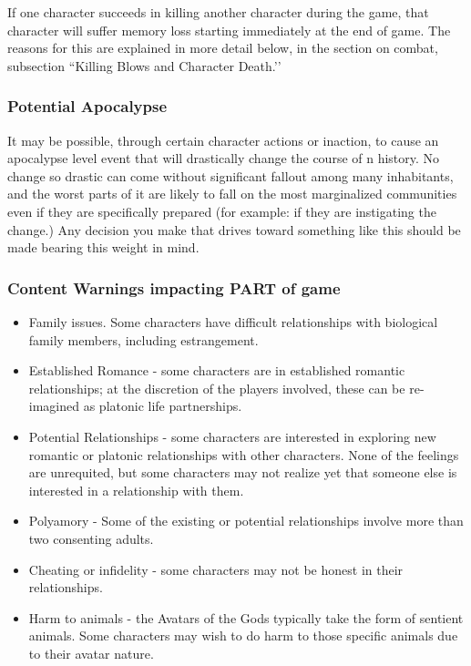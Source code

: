 \documentclass[sheet]{GL2020}
\begin{document}
If one character succeeds in killing another character during the game, that character will suffer memory loss starting immediately at the end of game. The reasons for this are explained in more detail below, in the section on combat, subsection ``Killing Blows and Character Death.’’

\subsubsection{Potential Apocalypse}
It may be possible, through certain character actions or inaction, to cause an apocalypse level event that will drastically change the course of \pEarth{}n history. No change so drastic can come without significant fallout among many inhabitants, and the worst parts of it are likely to fall on the most marginalized communities even if they are specifically prepared (for example: if they are instigating the change.) Any decision you make that drives toward something like this should be made bearing this weight in mind.

\subsubsection{Content Warnings impacting PART of game}
\begin{multicols}{2}
\begin{itemize}
  	\item Family issues. Some characters have difficult relationships with biological family members, including estrangement.
	\item Established Romance - some characters are in established romantic relationships; at the discretion of the players involved, these can be re-imagined as platonic life partnerships.
	\item Potential Relationships - some characters are interested in exploring new romantic or platonic relationships with other characters. None of the feelings are unrequited, but some characters may not realize yet that someone else is interested in a relationship with them.
	\item Polyamory - Some of the existing or potential relationships involve more than two consenting adults.
	\item Cheating or infidelity - some characters may not be honest in their relationships.
	\item Harm to animals - the Avatars of the Gods typically take the form of sentient animals. Some characters may wish to do harm to those specific animals due to their avatar nature.
\end{itemize}
\end{multicols}
\end{document}
